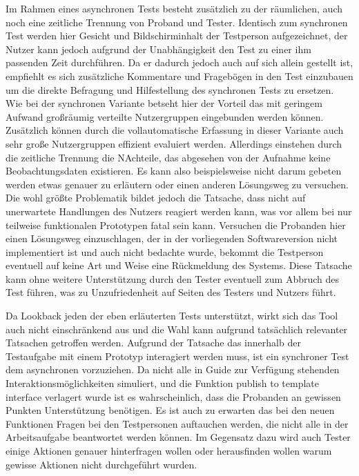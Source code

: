 Im Rahmen eines asynchronen Tests besteht zusätzlich zu der räumlichen, auch noch eine zeitliche Trennung von Proband und Tester.
Identisch zum synchronen Test werden hier Gesicht und Bildschirminhalt der Testperson aufgezeichnet, der Nutzer kann jedoch aufgrund der Unabhängigkeit den Test zu einer ihm passenden Zeit durchführen.
Da er dadurch jedoch auch auf sich allein gestellt ist, empfiehlt es sich zusätzliche Kommentare und Fragebögen in den Test einzubauen um die direkte Befragung und Hilfestellung des synchronen Tests zu ersetzen.
Wie bei der synchronen Variante betseht hier der Vorteil das mit geringem Aufwand großräumig verteilte Nutzergruppen eingebunden werden können.
Zusätzlich können durch die vollautomatische Erfassung in dieser Variante auch sehr große Nutzergruppen effizient evaluiert werden.
Allerdings einstehen durch die zeitliche Trennung die NAchteile, das abgesehen von der Aufnahme keine Beobachtungsdaten existieren.
Es kann also beispielsweise nicht darum gebeten werden etwas genauer zu erläutern oder einen anderen Lösungsweg zu versuchen.
Die wohl größte Problematik bildet jedoch die Tatsache, dass nicht auf unerwartete Handlungen des Nutzers reagiert werden kann, was vor allem bei nur teilweise funktionalen Prototypen fatal sein kann.
Versuchen die Probanden hier einen Lösungsweg einzuschlagen, der in der vorliegenden Softwareversion nicht implementiert ist und auch nicht bedachte wurde, bekommt die Testperson eventuell auf keine Art und Weise eine Rückmeldung des Systems.
Diese Tatsache kann ohne weitere Unterstützung durch den Tester eventuell zum Abbruch des Test führen, was zu Unzufriedenheit auf Seiten des Testers und Nutzers führt.\cite{Sarodnick.2016}

Da Lookback jeden der eben erläuterten Tests unterstützt, wirkt sich das Tool auch nicht einschränkend aus und die Wahl kann aufgrund tatsächlich relevanter Tatsachen getroffen werden.
Aufgrund der Tatsache das innerhalb der Testaufgabe mit einem Prototyp interagiert werden muss, ist ein synchroner Test dem asynchronen vorzuziehen.
Da nicht alle in Guide zur Verfügung stehenden Interaktionsmöglichkeiten simuliert, und die Funktion \glqq publish to template interface\grqq{} verlagert wurde ist es wahrscheinlich, dass die Probanden an gewissen Punkten Unterstützung benötigen.
Es ist auch zu erwarten das bei den neuen Funktionen Fragen bei den Testpersonen auftauchen werden, die nicht alle in der Arbeitsaufgabe beantwortet werden können.
Im Gegensatz dazu wird auch Tester einige Aktionen genauer hinterfragen wollen oder herausfinden wollen warum gewisse Aktionen nicht durchgeführt wurden.

